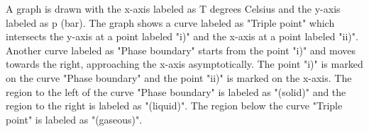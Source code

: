 A graph is drawn with the x-axis labeled as T degrees Celsius and the y-axis labeled as p (bar). The graph shows a curve labeled as "Triple point" which intersects the y-axis at a point labeled "i)" and the x-axis at a point labeled "ii)". Another curve labeled as "Phase boundary" starts from the point "i)" and moves towards the right, approaching the x-axis asymptotically. The point "i)" is marked on the curve "Phase boundary" and the point "ii)" is marked on the x-axis. The region to the left of the curve "Phase boundary" is labeled as "(solid)" and the region to the right is labeled as "(liquid)". The region below the curve "Triple point" is labeled as "(gaseous)".